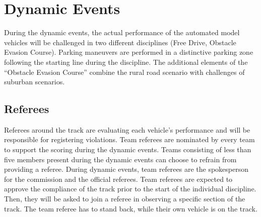 \chapter{Dynamic Events}

During the dynamic events, the actual performance of the automated model
vehicles will be challenged in two different disciplines (Free Drive, Obstacle 
Evasion Course). Parking maneuvers are performed in a distinctive parking zone 
following the starting line during the 
discipline. The additional elements of the “Obstacle Evasion Course” combine
the rural road scenario with challenges of suburban scenarios.

\section{Referees}

Referees around the track are evaluating each vehicle’s performance and will be
responsible for registering violations. Team referees are nominated by every
team to support the scoring during the dynamic events. Teams consisting of less
than five members present during the dynamic events can choose to refrain from
providing a referee. During dynamic events, team referees are the spokesperson
for the commission and the official referees. Team referees are expected to
approve the compliance of the track prior to the start of the individual
discipline. Then, they will be asked to join a referee in observing a specific
section of the track. The team referee has to stand back, while their own
vehicle is on the track.


